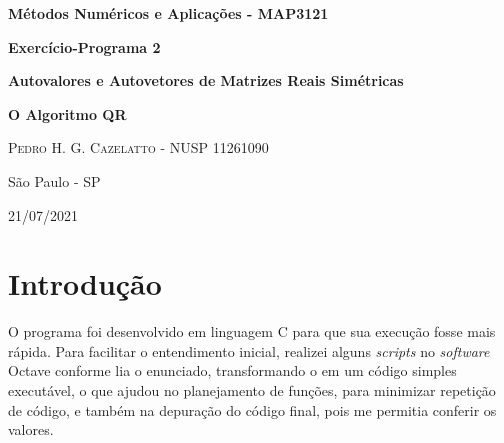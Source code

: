 \documentclass[12pt]{article} %
\begin{document}
    \begin{titlepage}
        \begin{center}
            
            \LARGE{\textbf{Métodos Numéricos e Aplicações - MAP3121}}
            
            \vspace{20pt}
            
            \LARGE{\textbf{Exercício-Programa 2}}
            
            \vspace{200pt}
            
            \LARGE{\textbf{Autovalores e Autovetores de Matrizes Reais Simétricas}}
            
            \vspace{40pt}
            
            \LARGE{\textbf{O Algoritmo QR}}
            
            \vspace{80pt}
            
            \begin{flushright}
                \Large{\textsc{Pedro H. G. Cazelatto - NUSP 11261090}}
            \end{flushright}
            
            \vfill
            
            São Paulo - SP
            
            21/07/2021
            
        \end{center}
    \end{titlepage}
    
    \section{Introdução}
    
        O programa foi desenvolvido em linguagem C para que sua execução fosse mais rápida. Para facilitar o entendimento inicial, realizei alguns \textit{scripts} no \textit{software} Octave conforme lia o enunciado, transformando o  em um código simples executável, o que ajudou no planejamento de funções, para minimizar repetição de código, e também na depuração do código final, pois me permitia conferir os valores.
        
        \vspace{\baselineskip}
        
\end{document}
